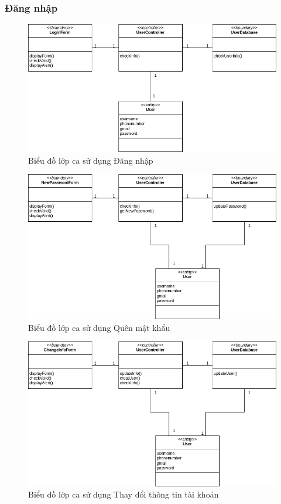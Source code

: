 \subsubsection{Đăng nhập}
\begin{figure}[H]
    \centering
    \includegraphics[width=\textwidth]{img2.2/Analysis-Đăng nhập.drawio.png}
    \caption{Biểu đồ lớp ca sử dụng Đăng nhập}
\end{figure}

\begin{figure}[H]
    \centering
    \includegraphics[width=\textwidth]{img2.2/Analysis-Quên mật khẩu.drawio.png}
    \caption{Biểu đồ lớp ca sử dụng Quên mật khẩu}
\end{figure}


\begin{figure}[H]
    \centering
    \includegraphics[width=\textwidth]{img2.2/Analysis-Thay đổi thông tin.drawio.png}
    \caption{Biểu đồ lớp ca sử dụng Thay đổi thông tin tài khoản}
\end{figure}

